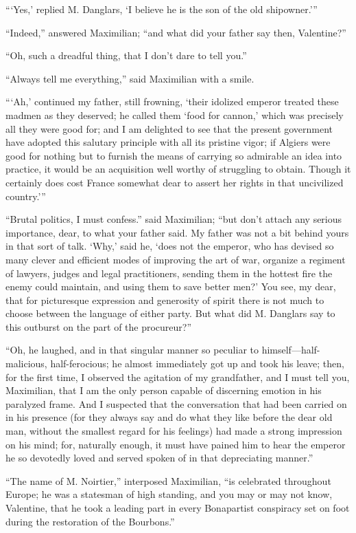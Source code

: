 “‘Yes,’ replied M. Danglars, ‘I believe he is the son of the old
shipowner.’”

“Indeed,” answered Maximilian; “and what did your father say then,
Valentine?”

“Oh, such a dreadful thing, that I don’t dare to tell you.”

“Always tell me everything,” said Maximilian with a smile.

“‘Ah,’ continued my father, still frowning, ‘their idolized emperor
treated these madmen as they deserved; he called them ‘food for
cannon,’ which was precisely all they were good for; and I am delighted
to see that the present government have adopted this salutary principle
with all its pristine vigor; if Algiers were good for nothing but to
furnish the means of carrying so admirable an idea into practice, it
would be an acquisition well worthy of struggling to obtain. Though it
certainly does cost France somewhat dear to assert her rights in that
uncivilized country.’”

“Brutal politics, I must confess.” said Maximilian; “but don’t attach
any serious importance, dear, to what your father said. My father was
not a bit behind yours in that sort of talk. ‘Why,’ said he, ‘does not
the emperor, who has devised so many clever and efficient modes of
improving the art of war, organize a regiment of lawyers, judges and
legal practitioners, sending them in the hottest fire the enemy could
maintain, and using them to save better men?’ You see, my dear, that
for picturesque expression and generosity of spirit there is not much
to choose between the language of either party. But what did M.
Danglars say to this outburst on the part of the procureur?”

“Oh, he laughed, and in that singular manner so peculiar to
himself—half-malicious, half-ferocious; he almost immediately got up
and took his leave; then, for the first time, I observed the agitation
of my grandfather, and I must tell you, Maximilian, that I am the only
person capable of discerning emotion in his paralyzed frame. And I
suspected that the conversation that had been carried on in his
presence (for they always say and do what they like before the dear old
man, without the smallest regard for his feelings) had made a strong
impression on his mind; for, naturally enough, it must have pained him
to hear the emperor he so devotedly loved and served spoken of in that
depreciating manner.”

“The name of M. Noirtier,” interposed Maximilian, “is celebrated
throughout Europe; he was a statesman of high standing, and you may or
may not know, Valentine, that he took a leading part in every
Bonapartist conspiracy set on foot during the restoration of the
Bourbons.”

